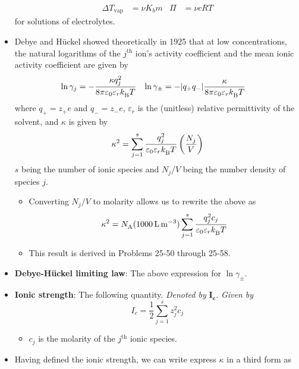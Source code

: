 \documentclass[../notes.tex]{subfiles}
\begin{document}
\begin{itemize}
\begin{align*}
        \Delta T_\text{vap} &= \nu K_bm&
        \Pi &= \nu cRT
    \end{align*}
    for solutions of electrolytes.
    \item Debye and H\"{u}ckel showed theoretically in 1925 that at low concentrations, the natural logarithms of the $j^\text{th}$ ion's activity coefficient and the mean ionic activity coefficient are given by
    \begin{align*}
        \ln\gamma_j &= -\frac{\kappa q_j^2}{8\pi\varepsilon_0\varepsilon_r{k_\text{B}^{}} T}&
        \ln\gamma_\pm &= -|q_+q_-|\frac{\kappa}{8\pi\varepsilon_0\varepsilon_r{k_\text{B}^{}} T}
    \end{align*}
    where $q_+=z_+e$ and $q_-=z_-e$, $\varepsilon_r$ is the (unitless) relative permittivity of the solvent, and $\kappa$ is given by
    \begin{equation*}
        \kappa^2 = \sum_{j=1}^s\frac{q_j^2}{\varepsilon_0\varepsilon_r{k_\text{B}^{}} T}\left( \frac{N_j}{V} \right)
    \end{equation*}
    $s$ being the number of ionic species and $N_j/V$ being the number density of species $j$.
    \begin{itemize}
        \item Converting $N_j/V$ to molarity allows us to rewrite the above as
        \begin{equation*}
            \kappa^2 = {N_\text{A}^{}}(\SI{1000}{\liter\per\cubic\meter})\sum_{j=1}^s\frac{q_j^2c_j}{\varepsilon_0\varepsilon_r{k_\text{B}^{}} T}
        \end{equation*}
        \item This result is derived in Problems 25-50 through 25-58.
    \end{itemize}
    \item \textbf{Debye-H\"{u}ckel limiting law}: The above expression for $\ln\gamma_\pm$.
    \item \textbf{Ionic strength}: The following quantity. \emph{Denoted by} $\bm{I_c}$. \emph{Given by}
    \begin{equation*}
        I_c = \frac{1}{2}\sum_{j=1}^sz_j^2c_j
    \end{equation*}
    \begin{itemize}
        \item $c_j$ is the molarity of the $j^\text{th}$ ionic species.
    \end{itemize}
    \item Having defined the ionic strength, we can write express $\kappa$ in a third form as
    \begin{equation*}

\end{equation*}
\end{itemize}
\end{document}
